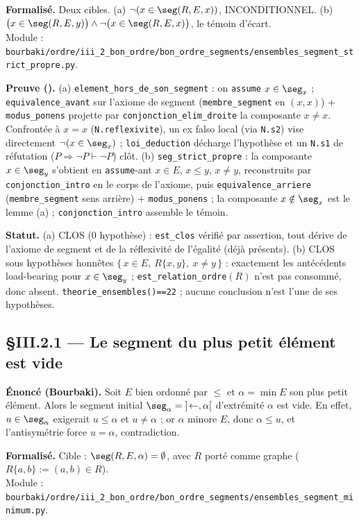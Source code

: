 \textbf{Formalisé.} Deux cibles. (a) $\neg(x\in\seg(R,E,x))$, INCONDITIONNEL. (b) $\bigl(x\in\seg(R,E,y)\bigr)\wedge\neg\bigl(x\in\seg(R,E,x)\bigr)$, le témoin d'écart. \\
Module : \texttt{bourbaki/ordre/iii\_2\_bon\_ordre/bon\_ordre\_segments/ensembles\_segment\_strict\_propre.py}.

\textbf{Preuve (\Nstar).} (a) \texttt{element\_hors\_de\_son\_segment} : on \texttt{assume} $x\in\seg_x$ ; \texttt{equivalence\_avant} sur l'axiome de segment (\texttt{membre\_segment} en $(x,x)$) + \texttt{modus\_ponens} projette par \texttt{conjonction\_elim\_droite} la composante $x\neq x$. Confrontée à $x=x$ (\texttt{N.reflexivite}), un ex falso local (via \texttt{N.s2}) vise directement $\neg(x\in\seg_x)$ ; \texttt{loi\_deduction} décharge l'hypothèse et un \texttt{N.s1} de réfutation ($P\Rightarrow\neg P \vdash \neg P$) clôt. (b) \texttt{seg\_strict\_propre} : la composante $x\in\seg_y$ s'obtient en \texttt{assume}-ant $x\in E$, $x\le y$, $x\neq y$, reconstruits par \texttt{conjonction\_intro} en le corps de l'axiome, puis \texttt{equivalence\_arriere} (\texttt{membre\_segment} sens arrière) + \texttt{modus\_ponens} ; la composante $x\notin\seg_x$ est le lemme (a) ; \texttt{conjonction\_intro} assemble le témoin.

\textbf{Statut.} (a) CLOS (0 hypothèse) : \texttt{est\_clos} vérifié par assertion, tout dérive de l'axiome de segment et de la réflexivité de l'égalité (déjà présents). (b) CLOS sous hypothèses honnêtes $\{\,x\in E,\ R\{x,y\},\ x\neq y\,\}$ : exactement les antécédents load-bearing pour $x\in\seg_y$ ; \texttt{est\_relation\_ordre}$(R)$ n'est pas consommé, donc absent. \texttt{theorie\_ensembles()==22} ; aucune conclusion n'est l'une de ses hypothèses.

\subsection{§III.2.1 --- Le segment du plus petit élément est vide}
\textbf{Énoncé (Bourbaki).} Soit $E$ bien ordonné par $\le$ et $\alpha = \min E$ son plus petit élément. Alors le segment initial $\seg_\alpha = {]\!\leftarrow,\alpha[}$ d'extrémité $\alpha$ est vide. En effet, $u\in\seg_\alpha$ exigerait $u\le\alpha$ et $u\neq\alpha$ ; or $\alpha$ minore $E$, donc $\alpha\le u$, et l'antisymétrie force $u=\alpha$, contradiction.

\textbf{Formalisé.} Cible : $\seg(R,E,\alpha)=\emptyset$, avec $R$ porté comme graphe ($R\{a,b\} := (a,b)\in R$). \\
Module : \texttt{bourbaki/ordre/iii\_2\_bon\_ordre/bon\_ordre\_segments/ensembles\_segment\_minimum.py}.

